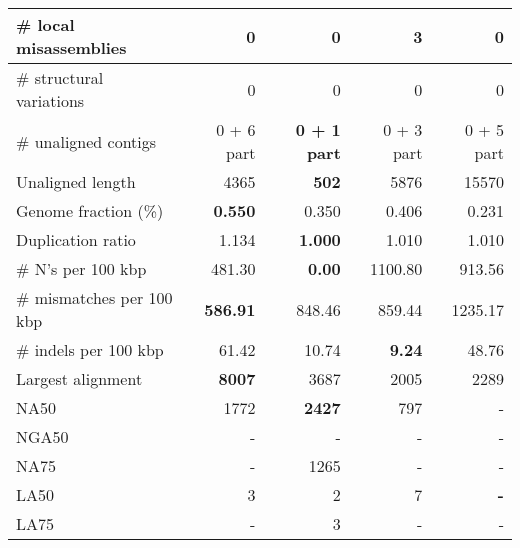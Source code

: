 \documentclass[12pt,a4paper]{article}
\begin{document}
\begin{table}[ht]
\begin{center}
\begin{tabular}{|l*{4}{|r}|}
\# local misassemblies & {\bf 0} & {\bf 0} & 3 & {\bf 0} \\ \hline
\# structural variations & 0 & 0 & 0 & 0 \\ \hline
\# unaligned contigs & 0 + 6 part & {\bf 0 + 1 part} & 0 + 3 part & 0 + 5 part \\ \hline
Unaligned length & 4365 & {\bf 502} & 5876 & 15570 \\ \hline
Genome fraction (\%) & {\bf 0.550} & 0.350 & 0.406 & 0.231 \\ \hline
Duplication ratio & 1.134 & {\bf 1.000} & 1.010 & 1.010 \\ \hline
\# N's per 100 kbp & 481.30 & {\bf 0.00} & 1100.80 & 913.56 \\ \hline
\# mismatches per 100 kbp & {\bf 586.91} & 848.46 & 859.44 & 1235.17 \\ \hline
\# indels per 100 kbp & 61.42 & 10.74 & {\bf 9.24} & 48.76 \\ \hline
Largest alignment & {\bf 8007} & 3687 & 2005 & 2289 \\ \hline
NA50 & 1772 & {\bf 2427} & 797 & - \\ \hline
NGA50 & - & - & - & - \\ \hline
NA75 & - & 1265 & - & - \\ \hline
LA50 & 3 & 2 & 7 & {\bf -} \\ \hline
LA75 & - & 3 & - & - \\ \hline
\end{tabular}
\end{center}
\end{table}
\end{document}
